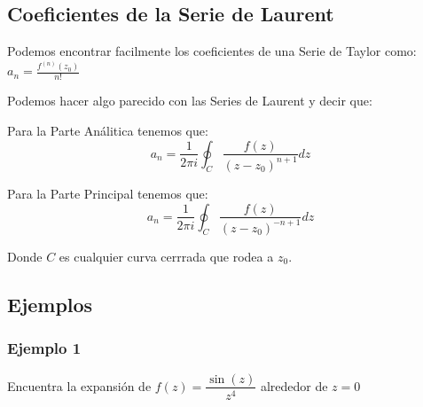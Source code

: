 \documentclass[12pt, fleqn]{report}                             %
\newcommand{\Wrap}[1]{\left( #1 \right)}                        %
\newcommand{\Sin}[1]{\sin\Wrap{#1}}                             %
\begin{document}
            \subsection{Coeficientes de la Serie de Laurent}

                Podemos encontrar facilmente los coeficientes de una Serie de Taylor como:\\
                $a_n = \frac{f^{(n)}(z_0)}{n!}$

                Podemos hacer algo parecido con las Series de Laurent y decir que:

                Para la Parte Análitica tenemos que:
                \begin{equation*}
                    a_n = \dfrac{1}{2 \pi i} \oint_C \dfrac{f(z)}{(z - z_0)^{n+1}} dz
                \end{equation*}

                Para la Parte Principal tenemos que:
                \begin{equation*}
                    a_n = \dfrac{1}{2 \pi i} \oint_C \dfrac{f(z)}{(z - z_0)^{-n+1}} dz
                \end{equation*}


                Donde $C$ es cualquier curva cerrrada que rodea a $z_0$.





            \clearpage
            \subsection{Ejemplos}


                \subsubsection{Ejemplo 1}

                    Encuentra la expansión de $f(z) = \dfrac{\Sin{z}}{z^4}$ alrededor
                    de $z = 0$
\end{document}

